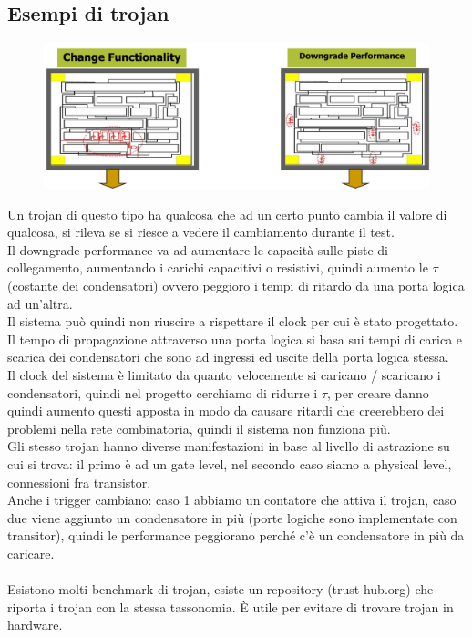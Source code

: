 \documentclass[oneside, 12pt]{extbook}
\begin{document}
\subsection{Esempi di trojan}
\begin{figure}[!h]
	\includegraphics[scale=0.4]{immagini/hardware/exa_troj_1.png}
\end{figure}
Un trojan di questo tipo ha qualcosa che ad un certo punto cambia il valore di qualcosa, si rileva se si riesce a vedere il cambiamento durante il test.
\\Il downgrade performance va ad aumentare le capacità sulle piste di collegamento, aumentando i carichi capacitivi o resistivi, quindi aumento le $\tau$ (costante dei condensatori) ovvero peggioro i tempi di ritardo da una porta logica ad un'altra.
\\Il sistema può quindi non riuscire a rispettare il clock per cui è stato progettato. Il tempo di propagazione attraverso una porta logica si basa sui tempi di carica e scarica dei condensatori che sono ad ingressi ed uscite della porta logica stessa.
\\Il clock del sistema è limitato da quanto velocemente si caricano / scaricano i condensatori, quindi nel progetto cerchiamo di ridurre i $\tau$, per creare danno quindi aumento questi apposta in modo da causare ritardi che creerebbero dei problemi nella rete combinatoria, quindi il sistema non funziona più.
\\Gli stesso trojan hanno diverse manifestazioni in base al livello di astrazione su cui si trova: il primo è ad un gate level, nel secondo caso siamo a physical level, connessioni fra transistor.\\Anche i trigger cambiano: caso 1 abbiamo un contatore che attiva il trojan, caso due viene aggiunto un condensatore in più (porte logiche sono implementate con transitor), quindi le performance peggiorano perché c'è un condensatore in più da caricare.\\\\Esistono molti benchmark di trojan, esiste un repository (trust-hub.org) che riporta i trojan con la stessa tassonomia. È utile per evitare di trovare trojan in hardware.
\end{document}
